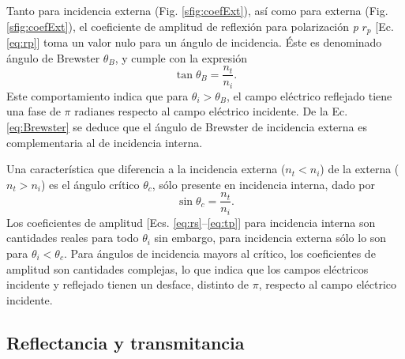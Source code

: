 Tanto para incidencia externa (Fig. \ref{sfig:coefExt}), así como para externa (Fig. \ref{sfig:coefExt}), el coeficiente de amplitud de reflexión para polarización \emph{p} $r_p$ [Ec. \eqref{eq:rp}] toma un valor nulo para un ángulo de incidencia. Éste es denominado ángulo de Brewster $\theta_B$, y cumple con la expresión
	\begin{equation}
	\tan\theta_B = \frac{n_t}{n_i}.
	\label{eq:Brewster}
	\end{equation}
Este comportamiento indica que para $\theta_i>\theta_B$, el campo eléctrico reflejado tiene una fase de $\pi$ radianes respecto al campo eléctrico incidente. De la Ec. \eqref{eq:Brewster} se deduce que el ángulo de Brewster de incidencia externa es complementaria al de incidencia interna.



Una característica que diferencia a la incidencia externa ($n_t<n_i$) de la externa ($n_t>n_i$) es el ángulo crítico $\theta_c$, sólo presente en incidencia interna, dado por
	\begin{equation}
	\sin\theta_c = \frac{n_t}{n_i}.
	\label{eq:Criticp}
	\end{equation}
Los coeficientes de amplitud [Ecs. \eqref{eq:rs}--\eqref{eq:tp}] para incidencia interna son cantidades reales para todo $\theta_i$ sin embargo, para incidencia externa sólo lo son para $\theta_i<\theta_c$. Para ángulos de incidencia mayors al crítico, los coeficientes de amplitud son cantidades complejas, lo que indica que los campos eléctricos incidente y reflejado tienen un desface, distinto de $\pi$, respecto al campo eléctrico incidente.
	

	\subsection{Reflectancia y transmitancia}

